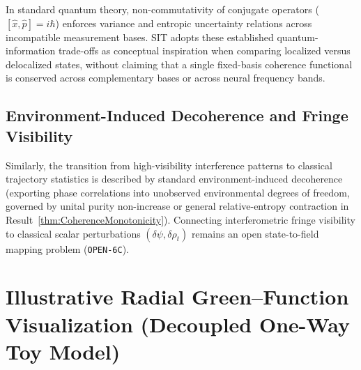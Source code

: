 In standard quantum theory, non-commutativity of conjugate operators ($[\hat{x}, \hat{p}] = i\hbar$) enforces variance and entropic uncertainty relations across incompatible measurement bases. SIT adopts these established quantum-information trade-offs as conceptual inspiration when comparing localized versus delocalized states, without claiming that a single fixed-basis coherence functional is conserved across complementary bases or across neural frequency bands.

\subsection{Environment-Induced Decoherence and Fringe Visibility}

Similarly, the transition from high-visibility interference patterns to classical trajectory statistics is described by standard environment-induced decoherence (exporting phase correlations into unobserved environmental degrees of freedom, governed by unital purity non-increase or general relative-entropy contraction in Result~\ref{thm:CoherenceMonotonicity}). Connecting interferometric fringe visibility to classical scalar perturbations $(\delta\psi, \delta\rho_t)$ remains an open state-to-field mapping problem (\texttt{OPEN-6C}).

\section{Illustrative Radial Green--Function Visualization (Decoupled One-Way Toy Model)}
\label{sec:sphericalresonancesrevisited}

